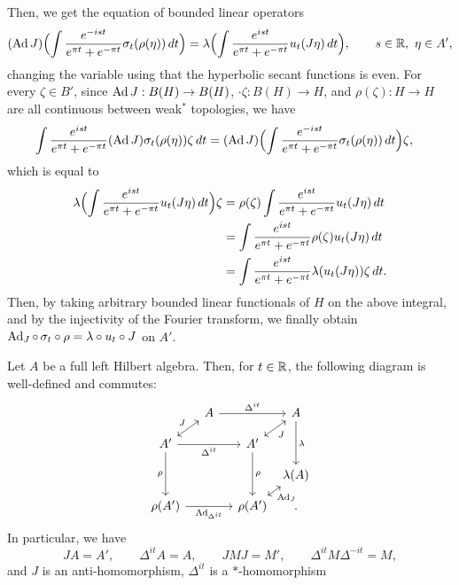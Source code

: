 \documentclass{../../../small}
\begin{document}
\begin{pf}
Then, we get the equation of bounded linear operators
\[(\operatorname{Ad} J)\Bigl(\int\frac{e^{-ist}}{e^{\pi t}+e^{-\pi t}}\sigma_t(\rho(\eta))\,dt\Bigr)
=\lambda\Bigl(\int\frac{e^{ist}}{e^{\pi t}+e^{-\pi t}}u_t(J\eta)\,dt\Bigr),\qquad s\in\mathbb{R},\ \eta\in A',\]
changing the variable using that the hyperbolic secant functions is even.
For every $\zeta\in B'$, since $\operatorname{Ad} J:B(H)\to B(H)$, $\cdot\zeta:B(H)\to H$, and $\rho(\zeta):H\to H$ are all continuous between weak$^*$ topologies, we have
\begin{align*}
\int\frac{e^{ist}}{e^{\pi t}+e^{-\pi t}}(\operatorname{Ad} J)\sigma_t(\rho(\eta))\zeta\,dt
&=(\operatorname{Ad} J)\Bigl(\int\frac{e^{-ist}}{e^{\pi t}+e^{-\pi t}}\sigma_t(\rho(\eta))\,dt\Bigr)\zeta,
\end{align*}
which is equal to
\begin{align*}
\lambda\Bigl(\int\frac{e^{ist}}{e^{\pi t}+e^{-\pi t}}u_t(J\eta)\,dt\Bigr)\zeta
&=\rho(\zeta)\int\frac{e^{ist}}{e^{\pi t}+e^{-\pi t}}u_t(J\eta)\,dt\\
&=\int\frac{e^{ist}}{e^{\pi t}+e^{-\pi t}}\rho(\zeta)u_t(J\eta)\,dt\\
&=\int\frac{e^{ist}}{e^{\pi t}+e^{-\pi t}}\lambda(u_t(J\eta))\zeta\,dt.
\end{align*}
Then, by taking arbitrary bounded linear functionals of $H$ on the above integral, and by the injectivity of the Fourier transform, we finally obtain $\operatorname{Ad}_J\circ\,\sigma_t\circ\rho=\lambda\circ u_t\circ J$ on $A'$.
\end{pf}

\begin{cor}
Let $A$ be a full left Hilbert algebra.
Then, for $t\in\mathbb{R}$, the following diagram is well-defined and commutes:
\[\begin{tikzcd}[column sep={3.5em,between origins},row sep={2.5em,between origins}]
&A\ar{rr}{\Delta^{it}}&&A\ar{dd}{\lambda}\\
A'\ar[<->]{ur}{J}\ar[swap]{rr}{\Delta^{it}}\ar[swap]{dd}{\rho}&&A'\ar[<->,swap]{ur}{J}\ar{dd}{\rho}&\\
&&&\lambda(A)\\
\rho(A')\ar[swap]{rr}{\Ad_{\Delta^{it}}}&&\rho(A')\ar[<->,swap]{ur}{\Ad_J}&.
\end{tikzcd}\]
In particular, we have
\[JA=A',\qquad\Delta^{it}A=A,\qquad JMJ=M',\qquad\Delta^{it}M\Delta^{-it}=M,\]
and $J$ is an anti-homomorphism, $\Delta^{it}$ is a $*$-homomorphism
\end{cor}
\begin{pf}

\end{pf}
\end{document}

